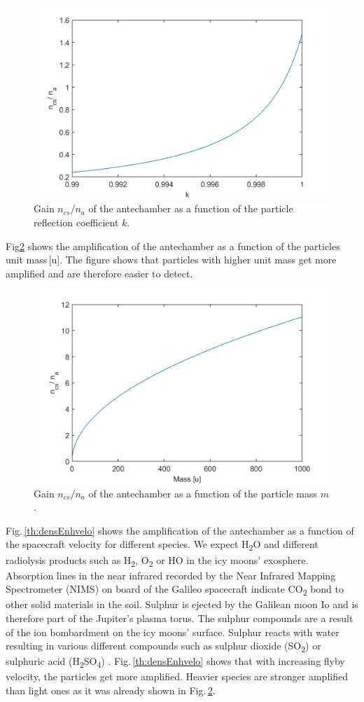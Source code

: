 	\begin{figure}[h!] %
		\centering
		\includegraphics[width= .7\textwidth]{Bilder/k.png}
		\caption{Gain $n_{cs}/n_a$ of the antechamber as a function of the particle reflection coefficient $k$.}
		\label{th:densEnhk}
	\end{figure}
	Fig\ref{th:densEnhm} shows the amplification of the antechamber as a function of the particles unit mass\,[u]. The figure shows that particles with higher unit mass get more amplified and are therefore easier to detect.\\
	\begin{figure}[h!] %
		\centering
		\includegraphics[width= .7\textwidth]{Bilder/m.png}
		\caption{Gain $n_{cs}/n_a$ of the antechamber as a function of the particle mass $m$.}
		\label{th:densEnhm}
	\end{figure}
	Fig.\,\ref{th:densEnhvelo} shows the amplification of the antechamber as a function of the spacecraft velocity for different species. We expect H\textsubscript{2}O and different radiolysis products such as H\textsubscript{2}, O\textsubscript{2} or HO in the icy moons' exosphere. Absorption lines in the near infrared recorded by the Near Infrared Mapping Spectrometer (NIMS) on board of the Galileo spacecraft indicate CO\textsubscript{2} bond to other solid materials in the soil. Sulphur is ejected by the Galilean moon Io and is therefore part of the Jupiter's plasma torus. The sulphur compounds are a result of the ion bombardment on the icy moons' surface. Sulphur reacts with water resulting in various different compounds such as sulphur dioxide (SO\textsubscript{2}) or sulphuric acid (H\textsubscript{2}SO\textsubscript{4}) \cite{Collins_2014}. Fig.\,\ref{th:densEnhvelo} shows that with increasing flyby velocity, the particles get more amplified. Heavier species are stronger amplified than light ones as it was already shown in Fig.\,\ref{th:densEnhm}.\\
